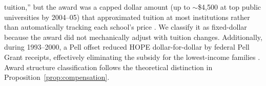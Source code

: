 \begin{table}[H]
\begin{threeparttable}
\begin{tablenotes}[flushleft]
  tuition,'' but the award was a capped dollar amount (up to
  $\sim$\$4,500 at top public universities by 2004--05) that
  approximated tuition at most institutions rather than automatically
  tracking each school's price
  \parencite{cornwell2006enrollment}. We classify it as
  fixed-dollar because the award did not mechanically adjust with
  tuition changes. Additionally, during 1993--2000, a Pell offset
  reduced HOPE dollar-for-dollar by federal Pell Grant receipts,
  effectively eliminating the subsidy for the lowest-income families
  \parencite{dynarski2000hope}. Award structure classification follows
  the theoretical distinction in Proposition~\ref{prop:compensation}.
\end{tablenotes}
\end{threeparttable}
\end{table}
